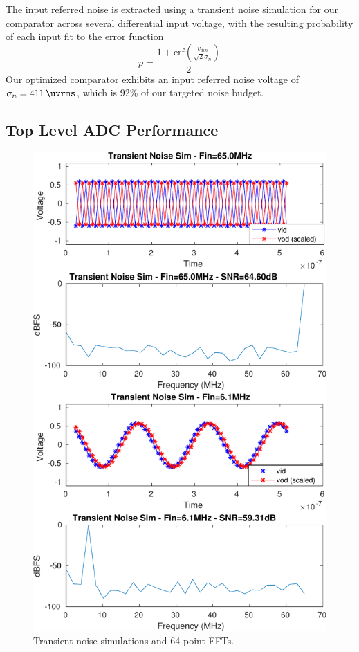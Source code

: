 \documentclass[10pt,journal]{IEEEtran}\usepackage{longtable}
\begin{document}
The input referred noise is extracted using a transient noise simulation for our comparator across several differential input voltage, with the resulting probability of each input fit to the error function \cite{nuzzo2008noise}
\begin{equation}
p=\frac{1+\text{erf}\left(\frac{v_{din}}{\sqrt{2}\sigma_n}\right)}{2}
\end{equation}
Our optimized comparator exhibits an input referred noise voltage of $\sigma_n=\SI{411}{\uvrms}$, which is 92\% of our targeted noise budget.
\subsection{Top Level ADC Performance}


\begin{figure}[tbph]
\begin{center}
\includegraphics[width=1\columnwidth]{final_sim-crop.pdf}
\caption{Transient noise simulations and 64 point FFTs.}
\label{fig:TransientSims}
\end{center}
\end{figure}
\end{document}
